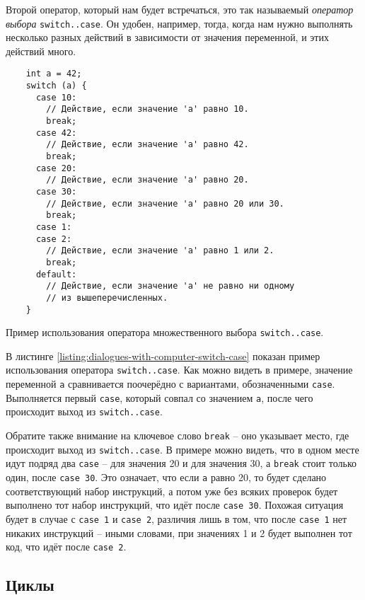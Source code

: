\documentclass[../sparc.tex]{subfiles}
\begin{document}
Второй оператор, который нам будет встречаться, это так называемый
\emph{оператор выбора} \texttt{switch..case}.  Он удобен, например, тогда, когда
нам нужно выполнять несколько разных действий в зависимости от значения
переменной, и этих действий много.

\begin{listing}[ht]
  \begin{verbatim}
    int a = 42;
    switch (a) {
      case 10:
        // Действие, если значение 'a' равно 10.
        break;
      case 42:
        // Действие, если значение 'a' равно 42.
        break;
      case 20:
        // Действие, если значение 'a' равно 20.
      case 30:
        // Действие, если значение 'a' равно 20 или 30.
        break;
      case 1:
      case 2:
        // Действие, если значение 'a' равно 1 или 2.
        break;
      default:
        // Действие, если значение 'a' не равно ни одному
        // из вышеперечисленных.
    }
  \end{verbatim}
  \label{listing:dialogues-with-computer-switch-case}
  \caption{Пример использования оператора множественного выбора
    \texttt{switch..case}.}
\end{listing}

В листинге \ref{listing:dialogues-with-computer-switch-case} показан пример
использования оператора \texttt{switch..case}.  Как можно видеть в примере,
значение переменной \texttt{a} сравнивается поочерёдно с вариантами,
обозначенными \texttt{case}.  Выполняется первый \texttt{case}, который совпал
со значением \texttt{a}, после чего происходит выход из \texttt{switch..case}.

Обратите также внимание на ключевое слово \texttt{break} -- оно указывает место,
где происходит выход из \texttt{switch..case}.  В примере можно видеть, что в
одном месте идут подряд два \texttt{case} -- для значения 20 и для значения 30, а
\texttt{break} стоит только один, после \texttt{case 30}.  Это означает, что
если \texttt{a} равно 20, то будет сделано соответствующий набор инструкций, а
потом уже без всяких проверок будет выполнено тот набор инструкций, что идёт
после \texttt{case 30}.  Похожая ситуация будет в случае с \texttt{case 1} и
\texttt{case 2}, различия лишь в том, что после \texttt{case 1} нет никаких
инструкций -- иными словами, при значениях 1 и 2 будет выполнен тот код, что идёт
после \texttt{case 2}.

\subsection{Циклы}
\end{document}
